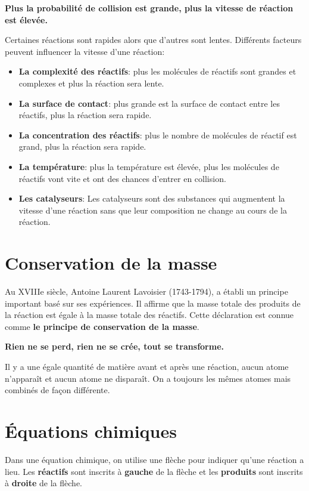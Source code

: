\documentclass[
  11pt,
  a4paper,
  openany]{book}
\providecommand{\tightlist}{%
  \setlength{\itemsep}{0pt}\setlength{\parskip}{0pt}}
\begin{document}
\textbf{Plus la probabilité de collision est grande, plus la vitesse de réaction est élevée.}

Certaines réactions sont rapides alors que d'autres sont lentes. Différents facteurs peuvent influencer la vitesse d'une réaction:

\begin{itemize}
\tightlist
\item
  \textbf{La complexité des réactifs}: plus les molécules de réactifs sont grandes et complexes et plus la réaction sera lente.
\item
  \textbf{La surface de contact}: plus grande est la surface de contact entre les réactifs, plus la réaction sera rapide.
\item
  \textbf{La concentration des réactifs}: plus le nombre de molécules de réactif est grand, plus la réaction sera rapide.
\item
  \textbf{La température}: plus la température est élevée, plus les molécules de réactifs vont vite et ont des chances d'entrer en collision.
\item
  \textbf{Les catalyseurs}: Les catalyseurs sont des substances qui augmentent la vitesse d'une réaction sans que leur composition ne change au cours de la réaction.
\end{itemize}

\section{Conservation de la masse}\label{conservation-de-la-masse}

Au XVIIIe siècle, Antoine Laurent Lavoisier (1743-1794), a établi un principe important basé sur ses expériences. Il affirme que la masse totale des produits de la réaction est égale à la masse totale des réactifs. Cette déclaration est connue comme \textbf{le principe de conservation de la masse}.

\textbf{Rien ne se perd, rien ne se crée, tout se transforme.}

Il y a une égale quantité de matière avant et après une réaction, aucun atome n'apparaît et aucun atome ne disparaît. On a toujours les mêmes atomes mais combinés de façon différente.

\section{Équations chimiques}\label{uxe9quations-chimiques}

Dans une équation chimique, on utilise une flèche pour indiquer qu'une réaction a lieu. Les \textbf{réactifs} sont inscrits à \textbf{gauche} de la flèche et les \textbf{produits} sont inscrits à \textbf{droite} de la flèche.
\end{document}
